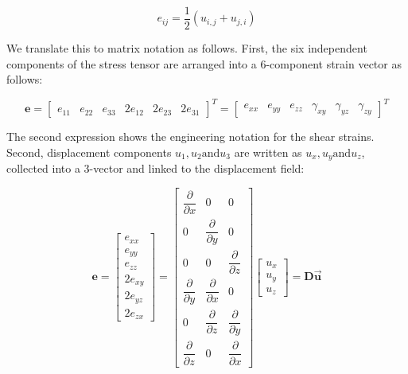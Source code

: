\begin{equation}
e_{ij} = \dfrac{1}{2} ( u_{i,j} + u_{j,i})
\end{equation}

We translate this to matrix notation as follows. First, the six independent components of the stress tensor are arranged into a 6-component strain vector as follows:

\begin{equation} \label{eq: tet4_strain in vector form}
\mathbf{e} = \begin{bmatrix}
e_{11} & e_{22} & e_{33} & 2e_{12} & 2e_{23} & 2e_{31}
\end{bmatrix}^T = \begin{bmatrix}
e_{xx} & e_{yy} & e_{zz} & \gamma_{xy} & \gamma_{yz} & \gamma_{zy}
\end{bmatrix}^T
\end{equation}

The second expression shows the engineering notation for the shear strains. Second, displacement components $ u_1,u_2 \mathrm{and} u_3 $ are written as $ u_x, u_y \mathrm{and} u_z $, collected into a 3-vector and linked to the displacement field:

\begin{equation}
\mathbf{e} = \begin{bmatrix}
e_{xx}\\
e_{yy}\\
e_{zz}\\
2e_{xy}\\
2e_{yz}\\
2e_{zx}
\end{bmatrix} = \begin{bmatrix}
\dfrac{\partial}{\partial x} & 0 & 0\\
0 & \dfrac{\partial}{\partial y} & 0\\
0 & 0 & \dfrac{\partial}{\partial z}\\
\dfrac{\partial}{\partial y} & \dfrac{\partial}{\partial x} & 0\\
0 & \dfrac{\partial}{\partial z} & \dfrac{\partial}{\partial y}\\
\dfrac{\partial}{\partial z} & 0 & \dfrac{\partial}{\partial x}
\end{bmatrix}\begin{bmatrix}
u_x\\
u_y\\
u_z
\end{bmatrix} = \mathbf{D}\vec{\mathbf{u}}
\end{equation}

